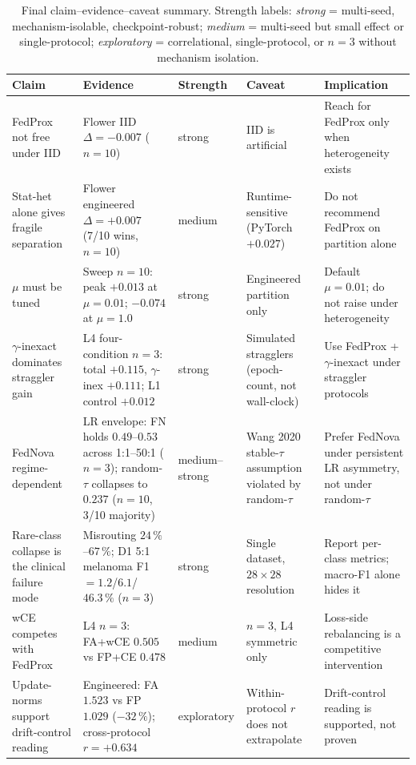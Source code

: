 \documentclass[11pt,a4paper]{report}
\begin{document}
\begin{table}[h]
\centering
\small
\caption{Final claim--evidence--caveat summary. Strength labels: \emph{strong}
= multi-seed, mechanism-isolable, checkpoint-robust; \emph{medium} =
multi-seed but small effect or single-protocol; \emph{exploratory} =
correlational, single-protocol, or $n=3$ without mechanism isolation.}
\label{tab:final-claims}
\begin{tabular}{p{3.0cm}p{3.6cm}p{1.6cm}p{2.6cm}p{2.6cm}}
\hline
Claim & Evidence & Strength & Caveat & Implication \\
\hline
FedProx not free under IID & Flower IID $\Delta = -0.007$ ($n=10$) & strong & IID is artificial & Reach for FedProx only when heterogeneity exists \\
Stat-het alone gives fragile separation & Flower engineered $\Delta = +0.007$ (7/10 wins, $n=10$) & medium & Runtime-sensitive (PyTorch $+0.027$) & Do not recommend FedProx on partition alone \\
$\mu$ must be tuned & Sweep $n=10$: peak $+0.013$ at $\mu = 0.01$; $-0.074$ at $\mu = 1.0$ & strong & Engineered partition only & Default $\mu = 0.01$; do not raise under heterogeneity \\
$\gamma$-inexact dominates straggler gain & L4 four-condition $n=3$: total $+0.115$, $\gamma$-inex $+0.111$; L1 control $+0.012$ & strong & Simulated stragglers (epoch-count, not wall-clock) & Use FedProx + $\gamma$-inexact under straggler protocols \\
FedNova regime-dependent & LR envelope: FN holds $0.49$--$0.53$ across 1:1--50:1 ($n=3$); random-$\tau$ collapses to $0.237$ ($n=10$, 3/10 majority) & medium--strong & Wang 2020 stable-$\tau$ assumption violated by random-$\tau$ & Prefer FedNova under persistent LR asymmetry, not under random-$\tau$ \\
Rare-class collapse is the clinical failure mode & Misrouting $24\,\%$--$67\,\%$; D1 5:1 melanoma F1 $= 1.2$/$6.1$/$46.3\,\%$ ($n=3$) & strong & Single dataset, $28 \times 28$ resolution & Report per-class metrics; macro-F1 alone hides it \\
wCE competes with FedProx & L4 $n=3$: FA+wCE $0.505$ vs FP+CE $0.478$ & medium & $n=3$, L4 symmetric only & Loss-side rebalancing is a competitive intervention \\
Update-norms support drift-control reading & Engineered: FA $1.523$ vs FP $1.029$ ($-32\,\%$); cross-protocol $r = +0.634$ & exploratory & Within-protocol $r$ does not extrapolate & Drift-control reading is supported, not proven \\
\hline
\end{tabular}
\end{table}
\end{document}
